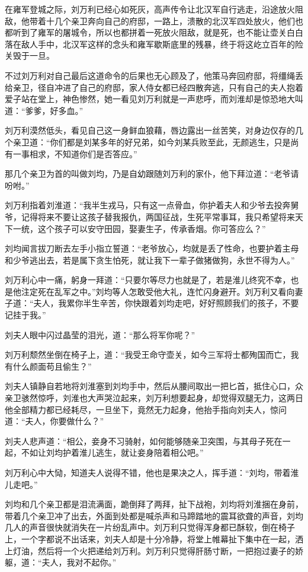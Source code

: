 在雍军登城之际，刘万利已经心如死灰，高声传令让北汉军自行逃走，沿途放火阻敌，他带着十几个亲卫奔向自己的府邸，一路上，溃散的北汉军四处放火，他们也都听到了雍军的屠城令，所以也都拼着一死放火阻敌，就是死，也不能让壶关白白落在敌人手中，北汉军这样的念头和雍军歇斯底里的残暴，终于将这屹立百年的险关毁于一旦。

不过刘万利对自己最后这道命令的后果也无心顾及了，他策马奔回府邸，将缰绳丢给亲卫，径自冲进了自己的府邸，家人侍女都已经四散奔逃，只有自己的夫人抱着爱子站在堂上，神色惨然，她一看见刘万利就是一声悲呼，而刘淮却是惊恐地大叫道：“爹爹，好多血。”

刘万利漠然低头，看见自己这一身鲜血狼藉，唇边露出一丝苦笑，对身边仅存的几个亲卫道：“你们都是刘某多年的好兄弟，如今刘某兵败至此，无颜逃生，只是尚有一事相求，不知道你们是否答应。”

那几个亲卫为首的叫做刘均，乃是自幼跟随刘万利的家仆，他下拜泣道：“老爷请吩咐。”

刘万利指着刘淮道：“我半生戎马，只有这一点骨血，你护着夫人和少爷去投奔舅爷，记得将来不要让这孩子替我报仇，两国征战，生死平常事耳，我只希望将来天下一统，这个孩子可以安守田园，娶妻生子，传承香烟。你可答应么？”

刘均闻言拔刀断去左手小指立誓道：“老爷放心，均就是丢了性命，也要护着主母和少爷逃出去，若是属下贪生怕死，就让我下一辈子做猪做狗，永世不得为人。”

刘万利心中一痛，躬身一拜道：“只要尔等尽力也就是了，若是淮儿终究不幸，也是他注定死在乱军之中。”刘均等人怎敢受他大礼，连忙闪身避开。刘万利又看向妻子道：“夫人，我累你半生辛苦，你快跟着刘均走吧，好好照顾我们的孩子，不要记挂于我。”

刘夫人眼中闪过晶莹的泪光，道：“那么将军你呢？”

刘万利颓然坐倒在椅子上，道：“我受王命守壶关，如今三军将士都殉国而亡，我有什么颜面苟且偷生？”

刘夫人镇静自若地将刘淮塞到刘均手中，然后从腰间取出一把匕首，抵住心口，众亲卫骇然惊呼，刘淮也大声哭泣起来，刘万利想要起身，却觉得双腿无力，这两日他全部精力都已经耗尽，一旦坐下，竟然无力起身，他抬手指向刘夫人，惊问道：“夫人，你要做什么？”

刘夫人悲声道：“相公，妾身不习骑射，如何能够随亲卫突围，与其母子死在一起，不如让刘均护着淮儿逃生，就让妾身陪着相公吧。”

刘万利心中大恸，知道夫人说得不错，他也是果决之人，挥手道：“刘均，带着淮儿走吧。”

刘均和几个亲卫都是泪流满面，跪倒拜了两拜，扯下战袍，刘均将刘淮捆在身前，带着几个亲卫冲了出去，外面到处都是喊杀声和马蹄踏地的震耳欲聋的声音，刘均几人的声音很快就消失在一片纷乱声中。刘万利只觉得浑身都已酥软，倒在椅子上，一个字都说不出话来，刘夫人却是十分冷静，将堂上帷幕扯下集中在一起，洒上灯油，然后将一个火把递给刘万利。刘万利只觉得肝肠寸断，一把抱过妻子的娇躯，道：“夫人，我对不起你。”

